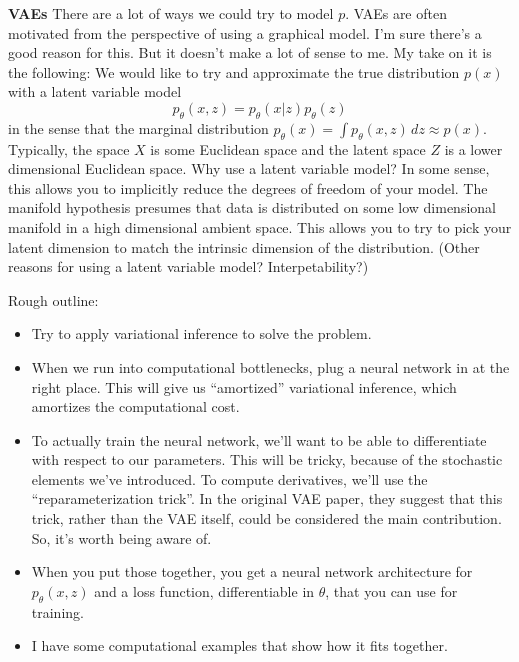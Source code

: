 \documentclass{article}
\newcommand{\dz}{\, dz}
\begin{document}

\vspace{1em}
\noindent \textbf{VAEs}
There are a lot of ways we could try to model $p$. VAEs are often motivated from the perspective of using a graphical model. I'm sure there's a good reason for this. But it doesn't make a lot of sense to me. My take on it is the following: We would like to try and approximate the true distribution $p(x)$ with a latent variable model
$$
p_\theta(x, z) = p_\theta(x|z)p_\theta(z)
$$
in the sense that the marginal distribution $p_\theta(x) = \int p_\theta(x,z)\dz \approx p(x)$. Typically, the space $X$ is some Euclidean space and the latent space $Z$ is a lower dimensional Euclidean space. Why use a latent variable model? In some sense, this allows you to implicitly reduce the degrees of freedom of your model. The manifold hypothesis presumes that data is distributed on some low dimensional manifold in a high dimensional ambient space. This allows you to try to pick your latent dimension to match the intrinsic dimension of the distribution. 
(Other reasons for using a latent variable model? Interpetability?)




\vspace{1em}
\noindent Rough outline: 
\begin{itemize}
  \item Try to apply variational inference to solve the problem. 
  \item When we run into computational bottlenecks, plug a neural network in at the right place. This will give us ``amortized'' variational inference, which amortizes the computational cost.
  \item To actually train the neural network, we'll want to be able to differentiate with respect to our parameters. This will be tricky, because of the stochastic elements we've introduced. To compute derivatives, we'll use the ``reparameterization trick''. In the original VAE paper, they suggest that this trick, rather than the VAE itself, could be considered the main contribution. So, it's worth being aware of. 
  \item When you put those together, you get a neural network architecture for $p_\theta(x, z)$ and a loss function, differentiable in $\theta$, that you can use for training. 
  \item I have some computational examples that show how it fits together.

\end{itemize}
\end{document}
